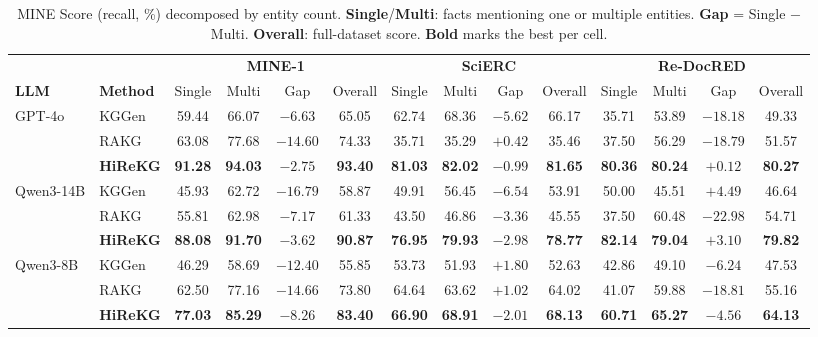 \documentclass[11pt]{article}
\begin{document}
\begin{table}[t!]
\centering
\small
\setlength{\tabcolsep}{3pt}
\begin{tabular}{ll|cccc|cccc|cccc}
\toprule
& & \multicolumn{4}{c|}{\textbf{MINE-1}} & \multicolumn{4}{c|}{\textbf{SciERC}} & \multicolumn{4}{c}{\textbf{Re-DocRED}} \\
\textbf{LLM} & \textbf{Method} & Single & Multi & Gap & Overall & Single & Multi & Gap & Overall & Single & Multi & Gap & Overall \\
\midrule
\multirow{3}{*}{GPT-4o} 
& KGGen      & 59.44 & 66.07 & $-6.63$ & 65.05 & 62.74 & 68.36 & $-5.62$  & 66.17 & 35.71 & 53.89 & $-18.18$ & 49.33 \\
& RAKG       & 63.08 & 77.68 & $-14.60$ & 74.33 & 35.71 & 35.29 & $+0.42$  & 35.46 & 37.50 & 56.29 & $-18.79$ & 51.57 \\
& \textbf{HiReKG} & \textbf{91.28} & \textbf{94.03} & $-2.75$  & \textbf{93.40} & \textbf{81.03} & \textbf{82.02} & $-0.99$  & \textbf{81.65} & \textbf{80.36} & \textbf{80.24} & $+0.12$  & \textbf{80.27} \\
\midrule
\multirow{3}{*}{Qwen3-14B} 
& KGGen      & 45.93 & 62.72 & $-16.79$ & 58.87 & 49.91 & 56.45 & $-6.54$  & 53.91 & 50.00 & 45.51 & $+4.49$  & 46.64 \\
& RAKG       & 55.81 & 62.98 & $-7.17$  & 61.33 & 43.50 & 46.86 & $-3.36$  & 45.55 & 37.50 & 60.48 & $-22.98$ & 54.71 \\
& \textbf{HiReKG} & \textbf{88.08} & \textbf{91.70} & $-3.62$  & \textbf{90.87} & \textbf{76.95} & \textbf{79.93} & $-2.98$  & \textbf{78.77} & \textbf{82.14} & \textbf{79.04} & $+3.10$  & \textbf{79.82} \\
\midrule
\multirow{3}{*}{Qwen3-8B} 
& KGGen      & 46.29 & 58.69 & $-12.40$ & 55.85 & 53.73 & 51.93 & $+1.80$  & 52.63 & 42.86 & 49.10 & $-6.24$  & 47.53 \\
& RAKG       & 62.50 & 77.16 & $-14.66$ & 73.80 & 64.64 & 63.62 & $+1.02$  & 64.02 & 41.07 & 59.88 & $-18.81$ & 55.16 \\
& \textbf{HiReKG} & \textbf{77.03} & \textbf{85.29} & $-8.26$  & \textbf{83.40} & \textbf{66.90} & \textbf{68.91} & $-2.01$  & \textbf{68.13} & \textbf{60.71} & \textbf{65.27} & $-4.56$  & \textbf{64.13} \\
\bottomrule
\end{tabular}
\caption{MINE Score (recall, \%) decomposed by entity count. \textbf{Single}/\textbf{Multi}: facts mentioning one or multiple entities. \textbf{Gap} = Single $-$ Multi. \textbf{Overall}: full-dataset score. \textbf{Bold} marks the best per cell.}
\label{tab:recall}
\end{table}
\end{document}
